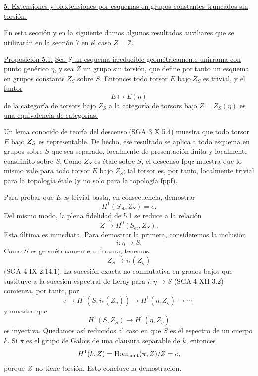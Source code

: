 
\medskip
\noindent\underline{5. Extensiones y biextensiones por esquemas en
grupos constantes truncados sin torsión.}

En esta sección y en la siguiente damos algunos resultados auxiliares
que se utilizarán en la sección 7 en el caso $Z=\mathbb Z$.

\medskip
\noindent\underline{Proposición 5.1.} \underline{Sea $S$ un esquema
irreducible geométricamente unirrama con punto genérico $\eta$, y sea
$Z$ un grupo sin torsión, que define por tanto un esquema en grupos
constante $Z_S$ sobre $S$. Entonces todo torsor $E$ bajo $Z_S$ es
trivial, y el funtor}
\[
 E\longmapsto E(\eta)
\]
\underline{de la categoría de torsors bajo $Z_S$ a la categoría de
torsors bajo $Z=Z_S(\eta)$ es una equivalencia de categorías.}

Un lema conocido de teoría del descenso (SGA 3 X 5.4) muestra que todo
torsor $E$ bajo $\sisi{G_S}{Z_S}$ es representable. De hecho, ese
resultado se aplica a todo esquema en grupos sobre $S$ que sea
separado, localmente de presentación finita y localmente cuasifinito
sobre $S$. Como $Z_S$ es étale sobre $S$, el descenso fpqc muestra que
lo mismo vale para todo torsor $E$ bajo $Z_S$; tal torsor es, por
tanto, localmente trivial para la \underline{topología étale} (y no
solo para la topología fppf).


Para probar que $E$ es trivial basta, en consecuencia, demostrar
\[
 H^1(S_{\mathrm{\acute{e}t}},Z_S)=e.
\]
Del mismo modo, la plena fidelidad de 5.1 se reduce a la relación
\[
 Z\xrightarrow{\ \sim\ }H^0(S_{\mathrm{\acute{e}t}},Z_S).
\]
Esta última es inmediata. Para demostrar la primera, consideremos la
inclusión
\[
 i:\eta\longrightarrow S.
\]
Como $S$ es geométricamente unirrama, tenemos
\[
 Z_S\xrightarrow{\ \sim\ }i_*(Z_\eta)
\]
(SGA 4 IX 2.14.1). La sucesión exacta no conmutativa en grados bajos
que sustituye a la sucesión espectral de Leray para $i:\eta\to S$
(SGA 4 XII 3.2) comienza, por tanto, por
\[
 e\longrightarrow H^1(S,i_*(Z_\eta))
   \longrightarrow H^1(\eta,Z_\eta)\longrightarrow\cdots,
\]
y muestra que
\[
 H^1(S,Z_S)\longrightarrow H^1(\eta,Z_\eta)
\]
es inyectiva. Quedamos así reducidos al caso en que $S$ es el espectro
de un cuerpo $k$. Si $\pi$ es el grupo de Galois de una clausura
separable de $k$, entonces
\[
 H^1(k,Z)=\Hom_{\mathrm{cont}}(\pi,Z)/Z=e,
\]
porque $\sisi{E}{Z}$ no tiene torsión. Esto concluye la demostración.

